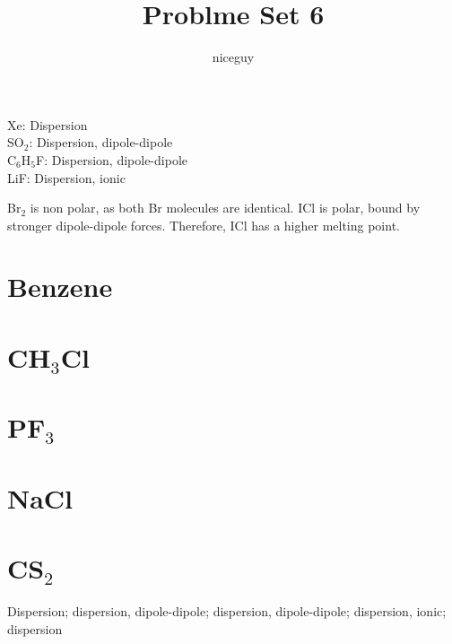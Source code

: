 \documentclass[answers]{exam}
\title{Problme Set 6}
\author{niceguy}
\begin{document}
\maketitle

\begin{questions}


\begin{solution}
	Xe: Dispersion \\
	SO$_2$: Dispersion, dipole-dipole \\
	C$_6$H$_5$F: Dispersion, dipole-dipole \\
	LiF: Dispersion, ionic
\end{solution}


\begin{solution}
	Br$_2$ is non polar, as both Br molecules are identical. ICl is polar, bound by stronger dipole-dipole forces. Therefore, ICl has a higher melting point.
\end{solution}


\begin{parts}
	\part{Benzene}
	\part{CH$_3$Cl}
	\part{PF$_3$}
	\part{NaCl}
	\part{CS$_2$}
\end{parts}

\begin{solution}
	Dispersion; dispersion, dipole-dipole; dispersion, dipole-dipole; dispersion, ionic; dispersion
\end{solution}


\end{questions}
\end{document}
